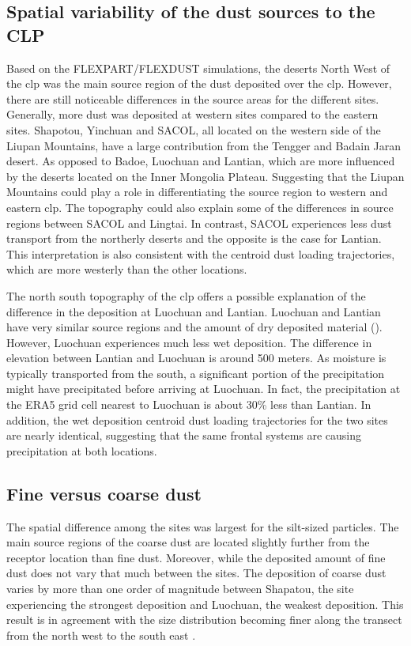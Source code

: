 \subsection{Spatial variability of the dust sources to the CLP}\label{sec:spatial_differences}
Based on the FLEXPART/FLEXDUST simulations, the deserts North West of the \acrshort{clp} was the main source region of the dust deposited over the \acrshort{clp}. 
However, there are still noticeable differences in the source areas for the different sites. 
Generally, more dust was deposited at western sites compared to the eastern sites.  Shapotou, Yinchuan and SACOL, all located on the western side of the Liupan Mountains, have a large contribution from the Tengger and Badain Jaran desert. As opposed to Badoe, Luochuan and Lantian, which are more influenced by the deserts located on the Inner Mongolia Plateau. Suggesting that the Liupan Mountains could play a role in differentiating the source region to western and eastern \acrshort{clp}.
The topography could also explain some of the differences in source regions between SACOL and Lingtai. In contrast, SACOL experiences less dust transport from the northerly deserts and the opposite is the case for Lantian. This interpretation is also consistent with the centroid dust loading trajectories, which are more westerly than the other locations. 

The north south topography of the \acrshort{clp} offers a possible explanation of the difference in the deposition at Luochuan and Lantian. Luochuan and Lantian have very similar source regions and the amount of dry deposited material (). 
However, Luochuan experiences much less wet deposition. The difference in elevation between Lantian and Luochuan is around 500 meters. 
As moisture is typically transported from the south, a significant portion of the precipitation might have precipitated before arriving at Luochuan. 
In fact, the precipitation at the ERA5 grid cell nearest to Luochuan is about 30\% less than Lantian. In addition, the wet deposition centroid dust loading trajectories for the two sites are nearly identical, suggesting that the same frontal systems are causing precipitation at both locations.  

\subsection{Fine versus coarse dust}\label{sec:fine_vs_coarse}
The spatial difference among the sites was largest for the silt-sized particles.
The main source regions of the coarse dust are located slightly further from the receptor location than fine dust. Moreover, while the deposited amount of fine dust does not vary that much between the sites. The deposition of coarse dust varies by more than one order of magnitude between Shapatou, the site experiencing the strongest deposition and Luochuan, the weakest deposition. This result is in agreement with the size distribution becoming finer along the transect from the north west to the south east \parencite{ding2000re,sun2003seasonal}.

